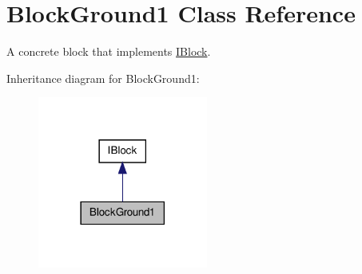 \hypertarget{class_block_ground1}{\section{Block\-Ground1 Class Reference}
\label{class_block_ground1}
}


A concrete block that implements \hyperlink{class_i_block}{I\-Block}.  




Inheritance diagram for Block\-Ground1\-:\nopagebreak
\begin{figure}[H]
\begin{center}
\leavevmode
\includegraphics[width=158pt]{class_block_ground1__inherit__graph}
\end{center}
\end{figure}
